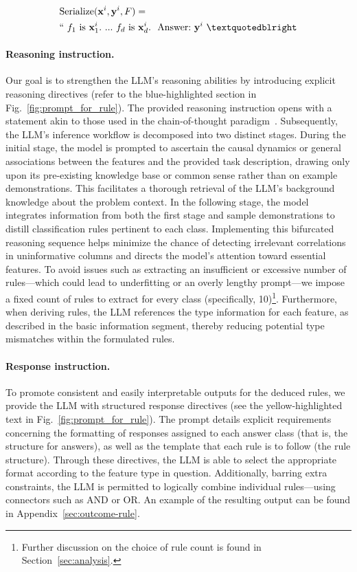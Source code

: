 \begin{align}
&\text{Serialize}(\mathbf{x}^i,\mathbf{y}^i, F) = \nonumber \\ 
&``\ f_1\ \text{is}\ \mathbf{x}^i_1.\ ... \ f_d\  \text{is}\  \mathbf{x}^i_d.\ \ \text{Answer:}\  \mathbf{y}^i\ ”
\end{align}

\vspace*{-0.12in}
\paragraph{Reasoning instruction.} Our goal is to strengthen the LLM’s reasoning abilities by introducing explicit reasoning directives (refer to the blue-highlighted section in Fig.~\ref{fig:prompt_for_rule}). The provided reasoning instruction opens with a statement akin to those used in the chain-of-thought paradigm~\cite{wei2022chain}. Subsequently, the LLM’s inference workflow is decomposed into two distinct stages. During the initial stage, the model is prompted to ascertain the causal dynamics or general associations between the features and the provided task description, drawing only upon its pre-existing knowledge base or common sense rather than on example demonstrations. This facilitates a thorough retrieval of the LLM’s background knowledge about the problem context. In the following stage, the model integrates information from both the first stage and sample demonstrations to distill classification rules pertinent to each class. Implementing this bifurcated reasoning sequence helps minimize the chance of detecting irrelevant correlations in uninformative columns and directs the model's attention toward essential features. To avoid issues such as extracting an insufficient or excessive number of rules—which could lead to underfitting or an overly lengthy prompt—we impose a fixed count of rules to extract for every class (specifically, 10)\footnote{Further discussion on the choice of rule count is found in Section~\ref{sec:analysis}.}. Furthermore, when deriving rules, the LLM references the type information for each feature, as described in the basic information segment, thereby reducing potential type mismatches within the formulated rules.

\vspace*{-0.12in}
\paragraph{Response instruction.} To promote consistent and easily interpretable outputs for the deduced rules, we provide the LLM with structured response directives (see the yellow-highlighted text in Fig.~\ref{fig:prompt_for_rule}). The prompt details explicit requirements concerning the formatting of responses assigned to each answer class (that is, the structure for answers), as well as the template that each rule is to follow (the rule structure). Through these directives, the LLM is able to select the appropriate format according to the feature type in question. Additionally, barring extra constraints, the LLM is permitted to logically combine individual rules—using connectors such as AND or OR. An example of the resulting output can be found in Appendix~\ref{sec:outcome-rule}.


